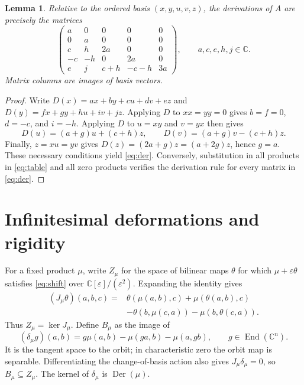 \documentclass[11pt]{article}
\newtheorem{lemma}[theorem]{Lemma}
\theoremstyle{remark}
\newcommand{\C}{\mathbb C}
\newcommand{\Der}{\operatorname{Der}}
\newcommand{\End}{\operatorname{End}}
\begin{document}
\begin{lemma}\label{lem:der}
Relative to the ordered basis $(x,y,u,v,z)$, the derivations of $A$ are precisely the matrices
\begin{equation}\label{eq:der}
 \begin{pmatrix}
 a&0&0&0&0\\
 0&a&0&0&0\\
 c&h&2a&0&0\\
 -c&-h&0&2a&0\\
 e&j&c+h&-c-h&3a
 \end{pmatrix},\qquad a,c,e,h,j\in\C.
\end{equation}
Matrix columns are images of basis vectors.
\end{lemma}
\begin{proof}
Write $D(x)=a x+b y+c u+d v+e z$ and $D(y)=f x+g y+h u+i v+j z$. Applying $D$ to $xx=yy=0$ gives $b=f=0$, $d=-c$, and $i=-h$. Applying $D$ to $u=xy$ and $v=yx$ then gives
\[
 D(u)=(a+g)u+(c+h)z,\qquad
 D(v)=(a+g)v-(c+h)z.
\]
Finally, $z=xu=yv$ gives $D(z)=(2a+g)z=(a+2g)z$, hence $g=a$. These necessary conditions yield \eqref{eq:der}. Conversely, substitution in all products in \eqref{eq:table} and all zero products verifies the derivation rule for every matrix in \eqref{eq:der}.
\end{proof}

\section{Infinitesimal deformations and rigidity}
For a fixed product $\mu$, write $Z_\mu$ for the space of bilinear maps $\theta$ for which $\mu+\varepsilon\theta$ satisfies \eqref{eq:shift} over $\C[\varepsilon]/(\varepsilon^2)$. Expanding the identity gives
\begin{equation}\label{eq:J}
\begin{split}
 (J_\mu\theta)(a,b,c)={}&\theta(\mu(a,b),c)+\mu(\theta(a,b),c)\\
 &-\theta(b,\mu(c,a))-\mu(b,\theta(c,a)).
\end{split}
\end{equation}
Thus $Z_\mu=\ker J_\mu$. Define $B_\mu$ as the image of
\begin{equation}\label{eq:delta}
 (\delta_\mu g)(a,b)=g\mu(a,b)-\mu(ga,b)-\mu(a,gb),
 \qquad g\in\End(\C^n).
\end{equation}
It is the tangent space to the orbit; in characteristic zero the orbit map is separable. Differentiating the change-of-basis action also gives $J_\mu\delta_\mu=0$, so $B_\mu\subseteq Z_\mu$. The kernel of $\delta_\mu$ is $\Der(\mu)$.
\end{document}
